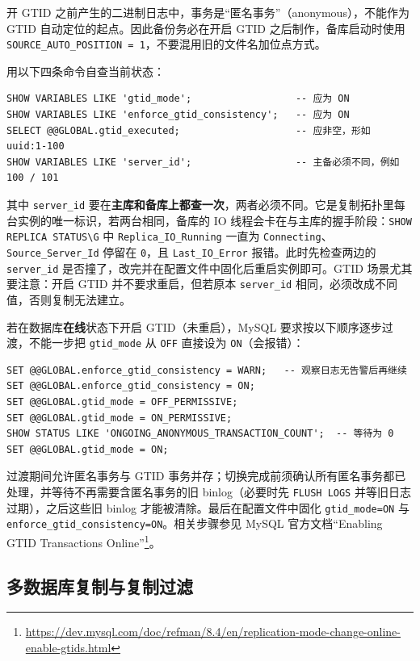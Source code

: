 \documentclass[12pt,UTF8]{ctexbook}
\begin{document}
开 GTID 之前产生的二进制日志中，事务是“匿名事务”（anonymous），不能作为 GTID 自动定位的起点。因此备份务必在开启 GTID 之后制作，备库启动时使用 \texttt{SOURCE\_AUTO\_POSITION = 1}，不要混用旧的文件名加位点方式。

用以下四条命令自查当前状态：

\begin{lstlisting}
SHOW VARIABLES LIKE 'gtid_mode';                  -- 应为 ON
SHOW VARIABLES LIKE 'enforce_gtid_consistency';   -- 应为 ON
SELECT @@GLOBAL.gtid_executed;                    -- 应非空，形如 uuid:1-100
SHOW VARIABLES LIKE 'server_id';                  -- 主备必须不同，例如 100 / 101
\end{lstlisting}

其中 \texttt{server\_id} 要在\textbf{主库和备库上都查一次}，两者必须不同。它是复制拓扑里每台实例的唯一标识，若两台相同，备库的 IO 线程会卡在与主库的握手阶段：\verb|SHOW REPLICA STATUS\G| 中 \texttt{Replica\_IO\_Running} 一直为 \texttt{Connecting}、\texttt{Source\_Server\_Id} 停留在 \texttt{0}，且 \texttt{Last\_IO\_Error} 报错。此时先检查两边的 \texttt{server\_id} 是否撞了，改完并在配置文件中固化后重启实例即可。GTID 场景尤其要注意：开启 GTID 并不要求重启，但若原本 \texttt{server\_id} 相同，必须改成不同值，否则复制无法建立。

若在数据库\textbf{在线}状态下开启 GTID（未重启），MySQL 要求按以下顺序逐步过渡，不能一步把 \texttt{gtid\_mode} 从 \texttt{OFF} 直接设为 \texttt{ON}（会报错）：

\begin{lstlisting}
SET @@GLOBAL.enforce_gtid_consistency = WARN;   -- 观察日志无告警后再继续
SET @@GLOBAL.enforce_gtid_consistency = ON;
SET @@GLOBAL.gtid_mode = OFF_PERMISSIVE;
SET @@GLOBAL.gtid_mode = ON_PERMISSIVE;
SHOW STATUS LIKE 'ONGOING_ANONYMOUS_TRANSACTION_COUNT';  -- 等待为 0
SET @@GLOBAL.gtid_mode = ON;
\end{lstlisting}

过渡期间允许匿名事务与 GTID 事务并存；切换完成前须确认所有匿名事务都已处理，并等待不再需要含匿名事务的旧 binlog（必要时先 \texttt{FLUSH LOGS} 并等旧日志过期），之后这些旧 binlog 才能被清除。最后在配置文件中固化 \texttt{gtid\_mode=ON} 与 \texttt{enforce\_gtid\_consistency=ON}。相关步骤参见 MySQL 官方文档“Enabling GTID Transactions Online”\footnote{\url{https://dev.mysql.com/doc/refman/8.4/en/replication-mode-change-online-enable-gtids.html}}。

\subsection{多数据库复制与复制过滤}
\label{sec:multi-db-filter}
\end{document}
